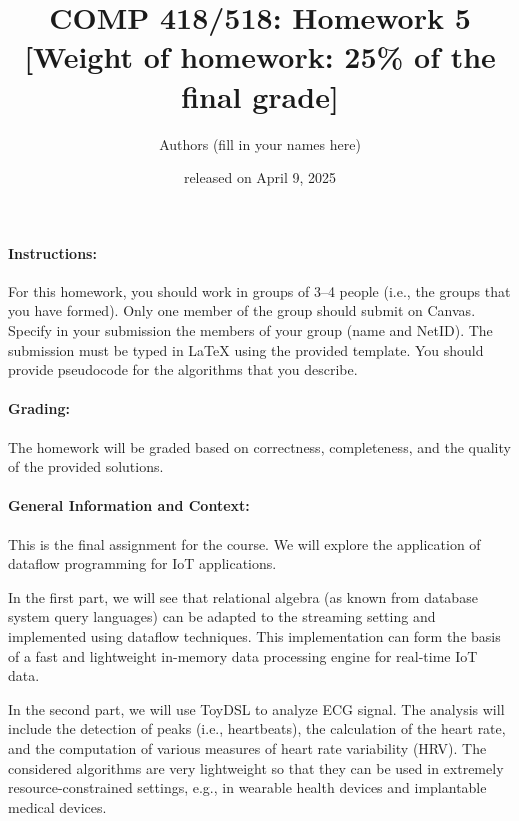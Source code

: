 \documentclass[11pt]{article}
\begin{document}
\title{COMP 418/518: Homework 5 \\[1ex] \large [Weight of homework: 25\% of the final grade]}
\author{Authors (fill in your names here)}
\date{released on April 9, 2025}

\maketitle


\paragraph{Instructions:}

For this homework, you should work in groups of 3--4 people (i.e., the groups that you have formed). Only one member of the group should submit on Canvas. Specify in your submission the members of your group (name and NetID). The submission must be typed in LaTeX using the provided template. You should provide pseudocode for the algorithms that you describe.

\paragraph{Grading:}

The homework will be graded based on correctness, completeness, and the quality of the provided solutions.

\paragraph{General Information and Context:}

This is the final assignment for the course. We will explore the application of dataflow programming for IoT applications.

In the first part, we will see that relational algebra (as known from database system query languages) can be adapted to the streaming setting and implemented using dataflow techniques. This implementation can form the basis of a fast and lightweight in-memory data processing engine for real-time IoT data.

In the second part, we will use ToyDSL to analyze ECG signal. The analysis will include the detection of peaks (i.e., heartbeats), the calculation of the heart rate, and the computation of various measures of heart rate variability (HRV). The considered algorithms are very lightweight so that they can be used in extremely resource-constrained settings, e.g., in wearable health devices and implantable medical devices.
\end{document}
